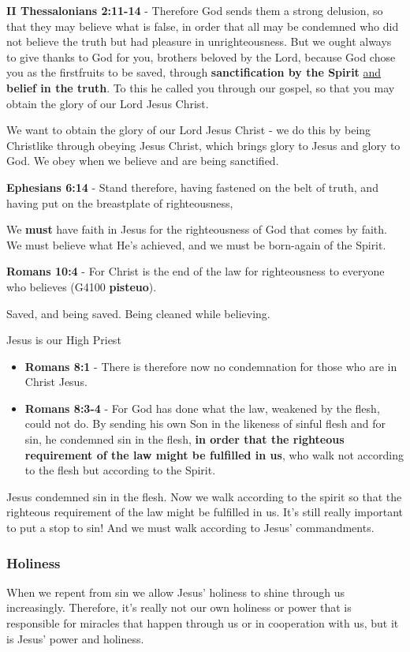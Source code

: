 \documentclass[11pt]{article}
\begin{document}
\textbf{II Thessalonians 2:11-14} - Therefore God sends them a strong delusion, so that they may believe what is false, in order that all may be condemned who did not believe the truth but had pleasure in unrighteousness. But we ought always to give thanks to God for you, brothers beloved by the Lord, because God chose you as the firstfruits to be saved, through \textbf{sanctification by the Spirit} \uline{and} \textbf{belief in the truth}. To this he called you through our gospel, so that you may obtain the glory of our Lord Jesus Christ.

We want to obtain the glory of our Lord Jesus Christ - we do this by being Christlike through obeying Jesus Christ, which brings glory to Jesus and glory to God. We obey when we believe and are being sanctified.

\textbf{Ephesians 6:14} - Stand therefore, having fastened on the belt of truth, and having put on the breastplate of righteousness,

We \textbf{must} have faith in Jesus for the righteousness of God that comes by faith.
We must believe what He's achieved, and we must be born-again of the Spirit.

\textbf{Romans 10:4} - For Christ is the end of the law for righteousness to everyone who believes (G4100 \textbf{pisteuo}).

Saved, and being saved. Being cleaned while believing.

Jesus is our High Priest
\begin{itemize}
\item \textbf{Romans 8:1} - There is therefore now no condemnation for those who are in Christ Jesus.
\item \textbf{Romans 8:3-4} - For God has done what the law, weakened by the flesh, could not do. By sending his own Son in the likeness of sinful flesh and for sin, he condemned sin in the flesh, \textbf{in order that the righteous requirement of the law might be fulfilled in us}, who walk not according to the flesh but according to the Spirit.
\end{itemize}

Jesus condemned sin in the flesh. Now we walk according to the spirit so that the righteous requirement of the law might be fulfilled in us.
It's still really important to put a stop to sin! And we must walk according to Jesus' commandments.

\subsubsection{Holiness}
\label{sec:org8bee273}
When we repent from sin we allow Jesus' holiness to shine through us increasingly.
Therefore, it's really not our own holiness or power that is responsible for miracles that happen through us or in cooperation with us, but it is Jesus' power and holiness.
\end{document}
